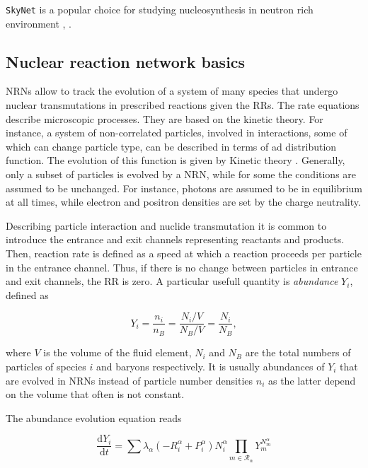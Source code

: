 \texttt{SkyNet} is a popular choice for studying nucleosynthesis in neutron rich environment \citep{Lippuner:2015gwa,Radice:2016dwd,Roberts:2016igt,Lippuner:2017tyn,Siegel:2017nub,Vlasov:2017nou,Fernandez:2016sbf} , .


\subsection{Nuclear reaction network basics}

\acp{NRN} allow to track the evolution of a system of many species that undergo nuclear transmutations in prescribed reactions given the \acp{RR}. The rate equations describe microscopic processes. They are based on the kinetic theory. For instance, a system of non-correlated particles, involved in interactions, some of which can change particle type, can be described in terms of  ad distribution function. The evolution of this function is given by Kinetic theory . 
Generally, only a subset of particles is evolved by a \ac{NRN}, while for some the conditions are assumed to be unchanged. For instance, photons are assumed to be in equilibrium at all times, while electron and positron densities are set by the charge neutrality. 

Describing particle interaction and nuclide transmutation it is common to introduce the entrance and exit channels representing reactants and products. Then, reaction rate is defined as a speed at which a reaction proceeds per particle in the entrance channel. Thus, if there is no change between particles in entrance and exit channels, the \ac{RR} is zero. A particular usefull quantity is \textit{abundance} $Y_i$, defined as 

\begin{equation}
\label{eq:theory:nuc:abundance}
Y_i = \frac{n_i}{n_B} = \frac{N_i/V}{N_B/V} = \frac{N_i}{N_B},
\end{equation}

where $V$ is the volume of the fluid element, $N_i$ and $N_B$ are the total numbers of particles of species $i$ and baryons respectively. 
It is usually abundances of $Y_i$ that are evolved in \acp{NRN} instead of particle number densities $n_i$ as the latter depend on the volume that often is not constant. 

The abundance evolution equation reads

\begin{equation}
\frac{\text{d}Y_i}{\text{d}t} = \sum\lambda_{\alpha}(-R_{i}^{\alpha}+P_{i}^{\alpha})N_{i}^{\alpha}\prod_{m\in\mathcal{R}_{\alpha}}Y_m^{N_{m}^{\alpha}}
\end{equation}

